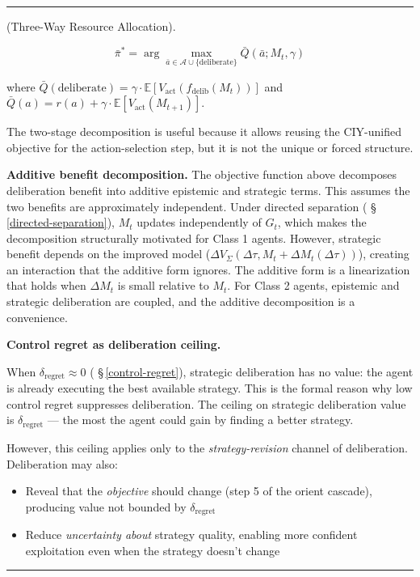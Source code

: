 \documentclass[11pt,oneside]{article}
\newcounter{claim}[section]
\renewcommand{\theclaim}{\thesection.\arabic{claim}}
\newenvironment{segment}[2]{%
  \refstepcounter{claim}%
  \bigskip\noindent\hrule\smallskip
  \noindent{\bfseries #1~\theclaim}\enskip(#2).\par\smallskip
  \noindent\ignorespaces
}{%
  \par\smallskip\noindent\hrule\bigskip
}
\newenvironment{discussion}[1][]{\begin{segment}{Discussion}{#1}}{\end{segment}}
\begin{document}
\begin{discussion}[Three-Way Resource Allocation]
$$\bar{\pi}^* = \arg\max_{\bar{a} \in \mathcal{A} \cup \{\text{deliberate}\}} \bar{Q}(\bar{a}; M_t, \gamma)$$

where $\bar{Q}(\text{deliberate}) = \gamma \cdot \mathbb{E}[V_{\text{act}}(f_{\text{delib}}(M_t))]$ and $\bar{Q}(a) = r(a) + \gamma \cdot \mathbb{E}[V_{\text{act}}(M_{t+1})]$.

The two-stage decomposition is useful because it allows reusing the CIY-unified objective for the action-selection step, but it is not the unique or forced structure.

\textbf{Additive benefit decomposition.} The objective function above decomposes deliberation benefit into additive epistemic and strategic terms. This assumes the two benefits are approximately independent. Under directed separation ( \S\,\ref{directed-separation}), $M_t$ updates independently of $G_t$, which makes the decomposition structurally motivated for Class 1 agents. However, strategic benefit depends on the improved model ($\Delta V_\Sigma(\Delta\tau, M_t + \Delta M_t(\Delta\tau))$), creating an interaction that the additive form ignores. The additive form is a linearization that holds when $\Delta M_t$ is small relative to $M_t$. For Class 2 agents, epistemic and strategic deliberation are coupled, and the additive decomposition is a convenience.


\medskip\noindent\textbf{Control regret as deliberation ceiling.}



When $\delta_{\text{regret}} \approx 0$ ( \S\,\ref{control-regret}), strategic deliberation has no value: the agent is already executing the best available strategy. This is the formal reason why low control regret suppresses deliberation. The ceiling on strategic deliberation value is $\delta_{\text{regret}}$ --- the most the agent could gain by finding a better strategy.

However, this ceiling applies only to the \textit{strategy-revision} channel of deliberation. Deliberation may also:
\begin{itemize}
  \item Reveal that the \textit{objective} should change (step 5 of the orient cascade), producing value not bounded by $\delta_{\text{regret}}$
  \item Reduce \textit{uncertainty about} strategy quality, enabling more confident exploitation even when the strategy doesn't change
\end{itemize}




\end{discussion}
\end{document}

